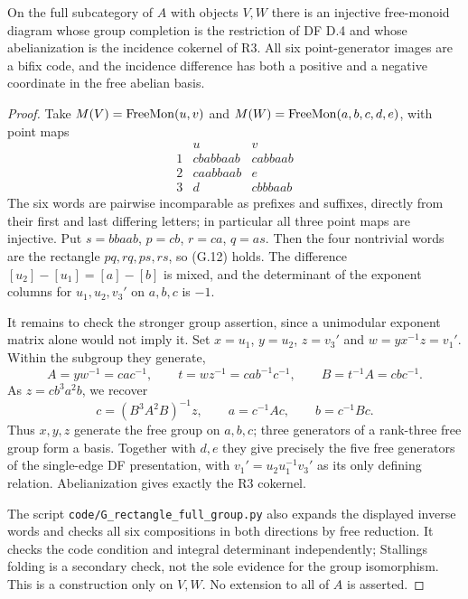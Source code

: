 \begin{proposition}
\label{G:localrectangle}
On the full subcategory of $A$ with objects $V,W$ there is an
injective free-monoid diagram whose group completion is the
restriction of DF D.4 and whose abelianization is the incidence
cokernel of R3.  All six point-generator images are a bifix
code, and the incidence difference has both a positive and a
negative coordinate in the free abelian basis.
\end{proposition}
\begin{proof}
Take $M(V)=\mathrm{FreeMon}(u,v)$ and
$M(W)=\mathrm{FreeMon}(a,b,c,d,e)$, with point maps
\[
\begin{array}{c|cc}
 &u&v\\ \hline
1&cbabbaab&cabbaab\\
2&caabbaab&e\\
3&d&cbbbaab
\end{array}
\tag{G.15}
\]
The six words are pairwise incomparable as prefixes and
suffixes, directly from their first and last differing letters;
in particular all three point maps are injective.
Put $s=bbaab$, $p=cb$, $r=ca$, $q=as$.
Then the four nontrivial words are the rectangle
$pq,rq,ps,rs$, so (G.12) holds.
The difference $[u_2]-[u_1]=[a]-[b]$ is mixed, and the
determinant of the exponent columns for $u_1,u_2,v_3'$ on
$a,b,c$ is $-1$.

It remains to check the stronger group assertion, since a
unimodular exponent matrix alone would not imply it.  Set
$x=u_1$, $y=u_2$, $z=v_3'$ and $w=yx^{-1}z=v_1'$.
Within the subgroup they generate,
\[
 A=yw^{-1}=cac^{-1},\qquad
 t=wz^{-1}=cab^{-1}c^{-1},\qquad
 B=t^{-1}A=cbc^{-1}.
\]
As $z=cb^3a^2b$, we recover
\[
 c=(B^3A^2B)^{-1}z,\qquad
 a=c^{-1}Ac,\qquad b=c^{-1}Bc.
\]
Thus $x,y,z$ generate the free group on $a,b,c$; three
generators of a rank-three free group form a basis.
Together with $d,e$ they give precisely the five free
generators of the single-edge DF presentation, with
$v_1'=u_2u_1^{-1}v_3'$ as its only defining relation.
Abelianization gives exactly the R3 cokernel.

The script \texttt{code/G\_rectangle\_full\_group.py}
also expands the displayed inverse words and checks all six
compositions in both directions by free reduction.  It checks
the code condition and integral determinant independently;
Stallings folding is a secondary check, not the sole evidence
for the group isomorphism.  This is a construction only on
$V,W$.  No extension to all of $A$ is asserted.
\end{proof}

